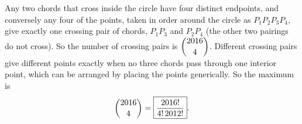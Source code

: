 Any two chords that cross inside the circle have four distinct endpoints, and conversely any four of the points, taken in order around the circle as $P_1P_2P_3P_4$, give exactly one crossing pair of chords, $P_1P_3$ and $P_2P_4$ (the other two pairings do not cross). So the number of crossing pairs is $\dbinom{2016}{4}$. Different crossing pairs give different points exactly when no three chords pass through one interior point, which can be arranged by placing the points generically. So the maximum is
\[
\dbinom{2016}{4}=\boxed{\dfrac{2016!}{4!\,2012!}}.
\]
